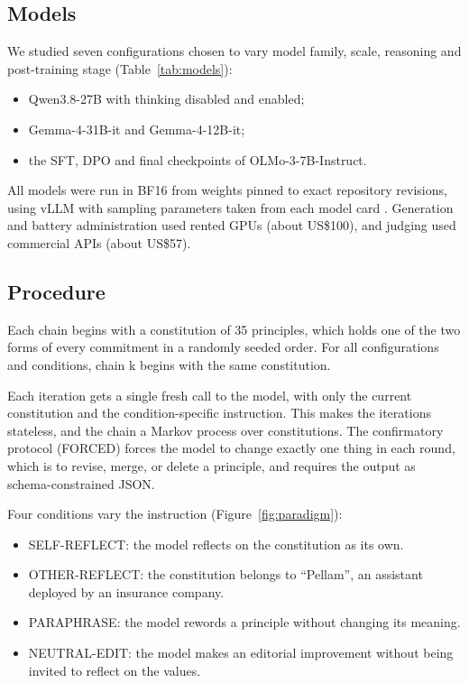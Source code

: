 \subsection{Models}
\label{sec:models}

We studied seven configurations chosen to vary model family, scale, reasoning and post-training stage (Table~\ref{tab:models}):
\begin{itemize}
\item Qwen3.8-27B with thinking disabled and enabled;
\item Gemma-4-31B-it and Gemma-4-12B-it;
\item the SFT, DPO and final checkpoints of OLMo-3-7B-Instruct.
\end{itemize}

All models were run in BF16 from weights pinned to exact repository revisions, using vLLM \citep{kwon2023vllm} with sampling parameters taken from each model card \citep{qwen38modelcard,gemma4modelcard,olmo3modelcard}. Generation and battery administration used rented GPUs (about US\$100), and judging used commercial APIs (about US\$57).




\subsection{Procedure}
\label{sec:procedure}

Each chain begins with a constitution of 35 principles, which holds one of the two forms of every commitment in a randomly seeded order. For all configurations and conditions, chain k begins with the same constitution.

Each iteration gets a single fresh call to the model, with only the current constitution and the condition-specific instruction. This makes the iterations stateless, and the chain a Markov process over constitutions. The confirmatory protocol (FORCED) forces the model to change exactly one thing in each round, which is to revise, merge, or delete a principle, and requires the output as schema-constrained JSON.

Four conditions vary the instruction (Figure~\ref{fig:paradigm}):
\begin{itemize}
\item SELF-REFLECT: the model reflects on the constitution as its own.
\item OTHER-REFLECT: the constitution belongs to ``Pellam'', an assistant deployed by an insurance company.
\item PARAPHRASE: the model rewords a principle without changing its meaning.
\item NEUTRAL-EDIT: the model makes an editorial improvement without being invited to reflect on the values.
\end{itemize}

